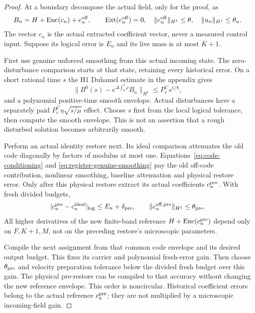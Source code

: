 \documentclass[11pt,a4paper]{amsart}
\theoremstyle{definition}
\theoremstyle{remark}
\numberwithin{equation}{section}
\newcommand{\norm}[1]{\lVert #1\rVert}
\begin{document}
\begin{proof}
At a boundary decompose the actual field, only for the proof, as
\begin{equation}\label{eq:actual-code-decomposition}
 B_n=H+\operatorname{Enc}(c_n)+e_n^{\rm off},\qquad
 \operatorname{Ext}(e_n^{\rm off})=0,
 \quad\norm{e_n^{\rm off}}_{H^1}\le\theta,
 \quad\norm{u_n}_{H^1}\le\theta_u.
\end{equation}
The vector $c_n$ is the actual extracted coefficient vector, never a
measured control input.  Suppose its logical error is $E_n$ and its live
mass is at most $K+1$.

First use genuine unforced smoothing from this actual incoming state.
The zero-disturbance comparison starts at that state, retaining every
historical error.  On a short rational time $s$ the H1 Duhamel estimate
in the appendix gives
\begin{equation}\label{eq:register-genuine-smoothing}
 \norm{B^0(s)-e^{\Delta\int_0^s\rho}B_n}_{H^1}
       \le P_c^Cs^{1/8},
\end{equation}
and a polynomial positive-time smooth envelope.  Actual disturbances
have a separately paid $P_c^C\eta\sqrt{s/\mu}$ effect.  Choose $s$ first
from the local logical tolerance, then compute the smooth envelope.
This is not an assertion that a rough disturbed solution becomes
arbitrarily smooth.

Perform an actual identity restore next.  Its ideal comparison attenuates
the old code diagonally by factors of modulus at most one.
Equations~\eqref{eq:code-conditioning} and
\eqref{eq:register-genuine-smoothing} pay the old off-code contribution,
nonlinear smoothing, baseline attenuation and physical restore error.
Only after this physical restore extract its actual coefficients
$c_n^{\rm pre}$.  With fresh divided budgets,
\begin{equation}\label{eq:register-pre-error}
 |c_n^{\rm pre}-c_n^{\rm ideal}|_{\rm log}
       \le E_n+\delta_{\rm pre},\qquad
 \norm{e_n^{\rm off,pre}}_{H^1}\le\theta_{\rm pre}.
\end{equation}
All higher derivatives of the new finite-band reference
$H+\operatorname{Enc}(c_n^{\rm pre})$ depend only on $F,K+1,M$, not on
the preceding restore's microscopic parameters.

Compile the next assignment from that common code envelope and its desired
output budget.  This fixes its carrier and polynomial fresh-error gain.
Then choose $\theta_{\rm pre}$ and velocity preparation tolerance below
the divided fresh budget over this gain.  The physical pre-restore can be
compiled to that accuracy without changing the new reference envelope.
This order is noncircular.  Historical coefficient errors belong to the
actual reference $c_n^{\rm pre}$; they are not multiplied by a microscopic
incoming-field gain.


\end{proof}
\end{document}
